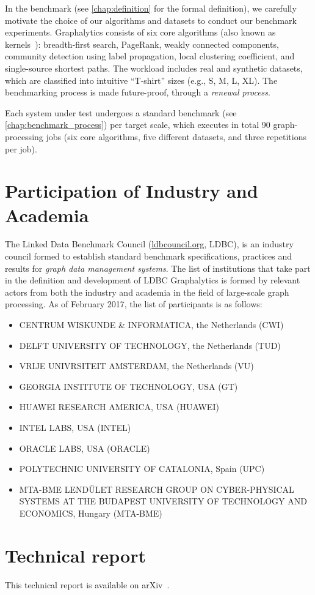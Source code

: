 In the benchmark (see \autoref{chap:definition} for the formal definition), we carefully motivate the choice of our algorithms and datasets to conduct our benchmark experiments. Graphalytics consists of six core algorithms (also known as kernels~\cite{DBLP:conf/hipc/BaderM05}): breadth-first search, PageRank, weakly connected components, community detection using label propagation, local clustering coefficient, and single-source shortest paths. The workload includes real and synthetic datasets, which are classified into intuitive ``T-shirt'' sizes (e.g., S, M, L, XL). The benchmarking process is made future-proof, through a {\it renewal process}. 

Each system under test undergoes a standard benchmark (see \autoref{chap:benchmark_process}) per target scale, which executes in total 90 graph-processing jobs (six core algorithms, five different datasets, and three repetitions per job).


\section{Participation of Industry and Academia}
The Linked Data Benchmark Council (\url{ldbcouncil.org}, LDBC), is an industry council formed to 
establish standard benchmark specifications, practices and results for {\em graph data management systems}. The list of institutions that take part in the definition and development of LDBC Graphalytics is formed by relevant actors from both the industry and academia in the field of large-scale graph processing. As of February 2017, the list of participants is as follows:

\begin{itemize}
	\item \MakeUppercase{Centrum Wiskunde \& Informatica}, the Netherlands (CWI)
	\item \MakeUppercase{Delft University of Technology}, the Netherlands (TUD)
	\item \MakeUppercase{Vrije Univrsiteit Amsterdam}, the Netherlands (VU)
	\item \MakeUppercase{Georgia Institute of Technology}, USA (GT)
	\item \MakeUppercase{Huawei Research America}, USA (HUAWEI)
	\item \MakeUppercase{Intel Labs}, USA (INTEL)
	\item \MakeUppercase{Oracle Labs}, USA (ORACLE)
	\item \MakeUppercase{Polytechnic University of Catalonia}, Spain (UPC)
	\item \MakeUppercase{MTA-BME Lend\"ulet Research Group on Cyber-Physical Systems at the Budapest University of Technology and Economics}, Hungary (MTA-BME)
\end{itemize}

\section{Technical report}

This technical report is available on arXiv~\cite{DBLP:journals/corr/abs-2011-15028}.

